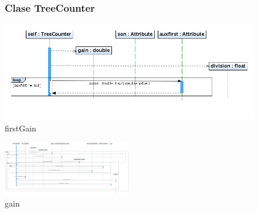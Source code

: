 \begin{figure}
\subsubsection{Clase TreeCounter}
\centering
\includegraphics[width=1\textwidth]{imgsSecuencia/TreeCounter/gananciaInicial.png}
\caption{firstGain}
\end{figure}
\newpage
\begin{figure}
\centering
\includegraphics[angle=90, width=0.5\textwidth]{imgsSecuencia/TreeCounter/ganancia.png}
\caption{gain}
\end{figure}
\newpage


